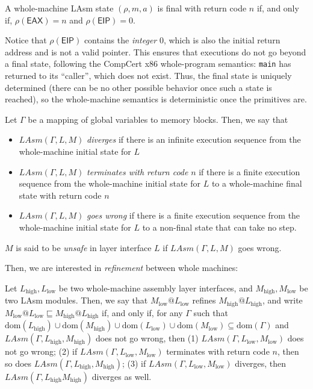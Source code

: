 \begin{definition}
A whole-machine LAsm state $(\rho, m, a)$ is final with return code
$n$ if, and only if, $\rho(\mathsf{EAX}) = n$ and $\rho(\mathsf{EIP}) =
0$.
\end{definition}

Notice that $\rho(\mathsf{EIP})$ contains the \emph{integer} 0,
which is also the initial return address and is not a valid pointer.
This ensures that executions do not
go beyond a final state, following the CompCert x86 whole-program
semantics: \texttt{main} has returned to its ``caller'', which does
not exist. Thus, the final state is uniquely determined (there can be
no other possible behavior once such a state is reached), so the
whole-machine semantics is deterministic once the primitives are.

\begin{definition}
Let $\Gamma$ be a mapping of global variables to memory blocks. Then, we say that
\begin{itemize}
\item $\mathit{LAsm}(\Gamma, L, M)$ \emph{diverges} if there is an
  infinite execution sequence from the whole-machine initial state for $L$
\item $\mathit{LAsm}(\Gamma, L, M)$ \emph{terminates with return code} $n$ if there is a finite execution sequence from the whole-machine initial state for $L$ to a whole-machine final state with return code $n$
\item $\mathit{LAsm}(\Gamma, L, M)$ \emph{goes wrong} if there is a finite execution sequence from the whole-machine initial state for $L$ to a non-final state that can take no step.
\end{itemize}
$M$ is said to be \emph{unsafe} in layer interface $L$ if $\mathit{LAsm}(\Gamma, L, M)$ goes wrong.
\end{definition}

Then, we are interested in \emph{refinement} between whole machines:
\begin{definition}
Let $L_{\text{high}}, L_{\text{low}}$ be two whole-machine assembly
layer interfaces, and $M_{\text{high}}, M_{\text{low}}$ be two LAsm
modules. Then, we say that $M_{\text{low}} @ L_{\text{low}}$ refines
$M_{\text{high}} @ L_{\text{high}}$, and write $M_{\text{low}} @
L_{\text{low}} \sqsubseteq M_{\text{high}} @ L_{\text{high}}$ if,
and only if, for any $\Gamma$ such that $
\mathrm{dom}(L_{\text{high}}) \cup \mathrm{dom}(M_{\text{high}}) \cup
\mathrm{dom}(L_{\text{low}}) \cup \mathrm{dom}(M_{\text{low}})
\subseteq \mathrm{dom}(\Gamma)$ and $\mathit{LAsm}(\Gamma, L_{\text{high}},
M_{\text{high}})$ does not go wrong, then
(1) $\mathit{LAsm}(\Gamma, L_{\text{low}}, M_{\text{low}})$ does not go wrong;
(2) if $\mathit{LAsm}(\Gamma, L_{\text{low}}, M_{\text{low}})$
  terminates with return code $n$, then so does $\mathit{LAsm}(\Gamma,
  L_{\text{high}}, M_{\text{high}})$;
(3) if $\mathit{LAsm}(\Gamma, L_{\text{low}}, M_{\text{low}})$
  diverges, then $\mathit{LAsm}(\Gamma, L_{\text{high}} 
  M_{\text{high}})$ diverges as well.
\end{definition}

